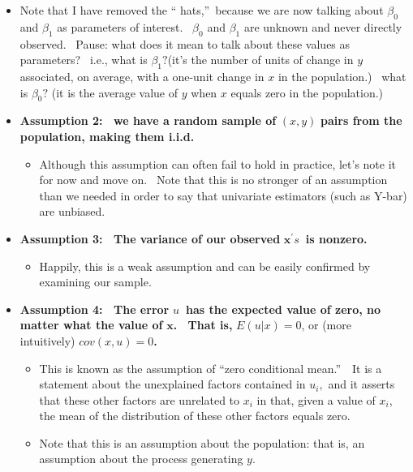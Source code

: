\documentclass[11pt]{article}
\begin{document}
\begin{itemize}
\item Note that I have removed the \textquotedblleft
hats,\textquotedblright\ because we are now talking about $\beta _{0}$ and $%
\beta _{1}$ as parameters of interest. \ $\beta _{0}$ and $\beta _{1}$ are
unknown and never directly observed. \ Pause: what does it mean to talk
about these values as parameters? \ i.e., what is $\beta _{1}?$(it's the
number of units of change in $y$ associated, on average, with a one-unit
change in $x$ in the population.) \ what is $\beta _{0}?$ (it is the average
value of $y$ when $x$ equals zero in the population.)

\item \textbf{Assumption 2: \ we have a random sample of }$(x,y)$ \textbf{%
pairs from the population, making them i.i.d.}

\begin{itemize}
\item Although this assumption can often fail to hold in practice, let's
note it for now and move on. \ Note that this is no stronger of an
assumption than we needed in order to say that univariate estimators (such
as Y-bar) are unbiased.
\end{itemize}

\item \textbf{Assumption 3: \ The variance of our observed }$\mathbf{x}%
^{\prime }s$\textbf{\ is nonzero.}

\begin{itemize}
\item Happily, this is a weak assumption and can be easily confirmed by
examining our sample. \ 
\end{itemize}

\item \textbf{Assumption 4: \ The error }$u$\textbf{\ has the expected value
of zero, no matter what the value of }$\mathbf{x}$\textbf{. \ That is, }$%
E(u|x)=0$, or (more intuitively) $cov\left( x,u\right) =0$\textbf{. \ }

\begin{itemize}
\item This is known as the assumption of \textquotedblleft zero conditional
mean.\textquotedblright\ \ It is a statement about the unexplained factors
contained in $u_{i},$ and it asserts that these other factors are unrelated
to $x_{i}$ in that, given a value of $x_{i}$, the mean of the distribution
of these other factors equals zero.

\item Note that this is an assumption about the population: that is, an
assumption about the process generating $y$.


\end{itemize}
\end{itemize}
\end{document}
